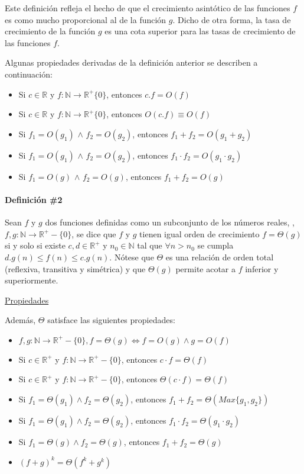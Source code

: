 Este definición refleja el hecho de que el crecimiento asintótico de las funciones $f$ es como mucho proporcional al de la función $g$. Dicho de otra forma, la tasa de crecimiento de la función $g$ es una
cota superior para las tasas de crecimiento de las funciones $f$.

Algunas propiedades derivadas de la definición anterior se describen a continuación:
\begin{itemize}
\item Si $c \in \mathbb{R}$ y $f:\mathbb{N} \to \mathbb{R}^+ \lbrace 0 \rbrace$, entonces $c.f = O(f)$
\item Si $c \in \mathbb{R}$ y $f:\mathbb{N} \to \mathbb{R}^+ \lbrace 0 \rbrace$, entonces $O(c.f) \equiv O(f)$
\item Si $f_1 = O(g_1)$ $\wedge$ $f_2 = O(g_2)$, entonces $f_1 + f_2 = O(g_1 + g_2)$
\item Si $f_1 = O(g_1)$ $\wedge$ $f_2 = O(g_2)$, entonces $f_1 \cdot f_2 = O(g_1 \cdot g_2)$
\item Si $f_1 = O(g)$ $\wedge$ $f_2 = O(g)$, entonces $f_1 + f_2 = O(g)$
\end{itemize}

\paragraph{Definición \#2}

Sean $f$ y $g$ dos funciones definidas como un subconjunto de los números reales, , $f,g:\mathbb{N} \to \mathbb{R}^+-\{0\}$, se dice que $f$ y $g$ tienen igual orden de crecimiento $f=\Theta(g)$ si y solo si existe $c,d \in \mathbb{R}^+$ y $n_0 \in \mathbb{N}$ tal que $\forall n > n_0$ se cumpla $d.g(n) \le f(n) \le c.g(n)$. Nótese que $\Theta$ es una relación de orden total (reflexiva, transitiva y simétrica) y que $\Theta(g)$ permite acotar a $f$ inferior y superiormente.

\underline{Propiedades}

Además, $\Theta$ satisface las siguientes propiedades:

\begin{itemize}
\item $f, g : \mathbb{N} \to \mathbb{R}^{+}-\{0\}, f = \Theta (g) \Leftrightarrow f = O(g) \wedge g = O(f)$
\item Si $c \in \mathbb{R}^{+}$ y $f: \mathbb{N} \to \mathbb{R}^{+}-\{0\}$, entonces $c \cdot f = \Theta(f)$
\item Si $c \in \mathbb{R}^{+}$ y $f: \mathbb{N} \to \mathbb{R}^{+}-\{0\}$, entonces $\Theta(c \cdot f) = \Theta(f)$
\item Si $f_1 = \Theta(g_1) \wedge f_2 = \Theta(g_2)$, entonces $f_1 + f_2 = \Theta (Max\{g_1, g_2\})$
\item Si $f_1 = \Theta(g_1) \wedge f_2 = \Theta(g_2)$, entonces $f_1 \cdot f_2 = \Theta (g_1 \cdot g_2)$
\item Si $f_1 = \Theta(g) \wedge f_2 = \Theta(g)$, entonces $f_1 + f_2 = \Theta (g)$
\item $(f+g)^k = \Theta(f^k + g^k)$
\end{itemize}

